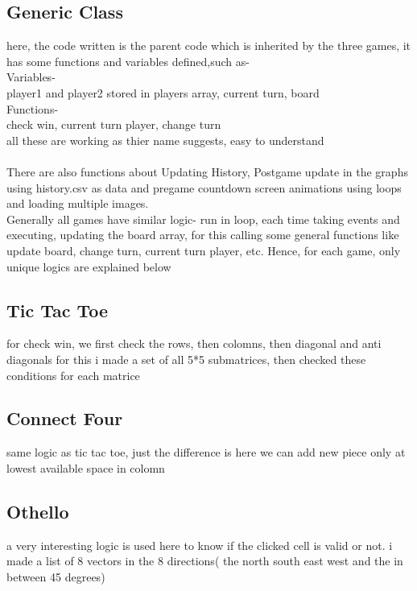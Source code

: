 \documentclass{article}
\begin{document}
\subsection{Generic Class}
here, the code written is the parent code which is inherited by the three games, it has some functions and variables defined,such as-\\

Variables-\\
player1 and player2 stored in players array, current turn, board\\

Functions- \\
check win, current turn player, change turn\\

all these are working as thier name suggests, easy to understand\\
\\
There are also functions about Updating History, Postgame update in the graphs using history.csv as data and pregame countdown screen animations using loops and loading multiple images.\\
Generally all games have similar logic- run in loop, each time taking events and executing, updating the board array, for this calling some general functions like update board, change turn, current turn player, etc.
Hence, for each game, only unique logics are explained below
\subsection{Tic Tac Toe}
for check win, we first check the rows, then colomns, then diagonal and anti diagonals
for this i made a set of all 5*5 submatrices, then checked these conditions for each matrice
\subsection{Connect Four}
same logic as tic tac toe, just the difference is here we can add new piece only at lowest available space in colomn

\subsection{Othello}
a very interesting logic is used here to know if the clicked cell is valid or not. 
i made a list of 8 vectors in the 8 directions( the north south east west and the in between 45 degrees)
\end{document}
